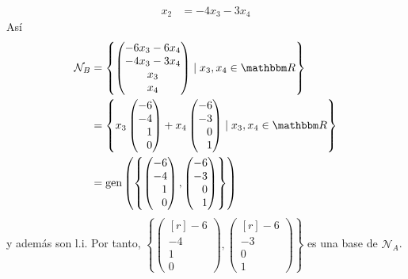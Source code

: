 \begin{example}
\begin{align*}
        x_2 & = -4x_3 - 3x_4
    \end{align*}
    Así
    \begin{align*}
        \mathcal{N}_B & = \left\{ \begin{pmatrix}
            -6x_3 - 6x_4 \\
            -4x_3 - 3x_4 \\
            x_3 \\
            x_4
        \end{pmatrix} \mid x_3,  x_4 \in \RR \right\} \\
        & = \left\{ x_3 \begin{pmatrix*}[r]
            -6 \\
            -4 \\
            1 \\
            0
        \end{pmatrix*} + x_4 \begin{pmatrix*}[r]
            -6 \\
            -3 \\
            0 \\
            1
        \end{pmatrix*} \mid x_3,  x_4 \in \RR \right\} \\
        & = \Gen \left(\left\{ \begin{pmatrix*}[r]
            -6 \\
            -4 \\
            1 \\
            0
        \end{pmatrix*},  \begin{pmatrix*}[r]
            -6 \\
            -3 \\
            0 \\
            1
        \end{pmatrix*} \right\}\right)
    \end{align*}
    y además son l.i. Por tanto, $\left\{ \begin{pmatrix*}[r]
        -6 \\
        -4 \\
        1 \\
        0
    \end{pmatrix*},  \begin{pmatrix*}[r]
        -6 \\
        -3 \\
        0 \\
        1
    \end{pmatrix*} \right\}$ es una base de $\mathcal{N}_A$.
\end{example}

